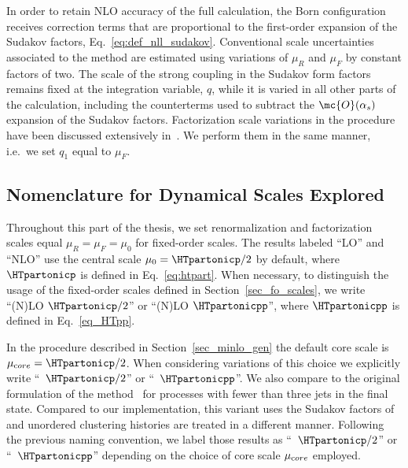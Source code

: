 In order to retain NLO accuracy of the full calculation, the Born configuration
receives correction terms that are proportional to the first-order expansion of the Sudakov
factors, Eq.~\eqref{eq:def_nll_sudakov}. Conventional scale uncertainties associated to the \MINLO{} method are estimated
using variations of $\mu_R$ and $\mu_F$ by constant factors of two. The scale of
the strong coupling in the Sudakov form factors remains fixed at the integration variable, $q$,
while it is varied in all other parts of the calculation, including the \MINLO{} counterterms
used to subtract the $\mc{O}(\alpha_s)$ expansion of the Sudakov factors.
Factorization scale variations in the \MINLOp{} procedure have been
discussed extensively in~\cite{ttjjj}. We perform them in the same manner,
i.e.\ we set $q_1$ equal to $\mu_F$.

\subsection{Nomenclature for Dynamical Scales Explored}
\label{sec_scale_notation}
Throughout this part of the thesis, we set renormalization and factorization scales equal
$\mu_R=\mu_F=\mu_0$ for fixed-order scales. The results labeled ``LO'' and ``NLO'' use the
central scale $\mu_0=\HTpartonicp/2$ by default, where $\HTpartonicp$ is defined
in Eq.~\eqref{eq:htpart}. When necessary, to distinguish the usage of the fixed-order
scales defined in Section~\ref{sec_fo_scales}, we write ``(N)LO
$\HTpartonicp/2$'' or ``(N)LO $\HTpartonicpp$'', where $\HTpartonicpp$ is
defined in Eq.~\eqref{eq_HTpp}. 

In the \MINLOp{} procedure described in Section~\ref{sec_minlo_gen} the default
core scale is $\mu_{\textrm core}=\HTpartonicp/2$. When considering variations of
this choice we explicitly write ``\MILNLOp{}~$\HTpartonicp/2$'' or
``\MILNLOp{}~$\HTpartonicpp$''. We also compare to the original formulation of the \MINLO{}
method~\cite{MINLO} for processes with fewer than three jets in the
final state. Compared to our implementation, this variant
uses the Sudakov factors of~\cite{Catani:1991hj} and unordered clustering histories
are treated in a different manner. Following the previous naming convention, we label those results as 
``\MILNLO{}~$\HTpartonicp/2$'' or ``\MILNLO{}~$\HTpartonicpp$'' depending on the
choice of core scale $\mu_{\textrm core}$ employed.
